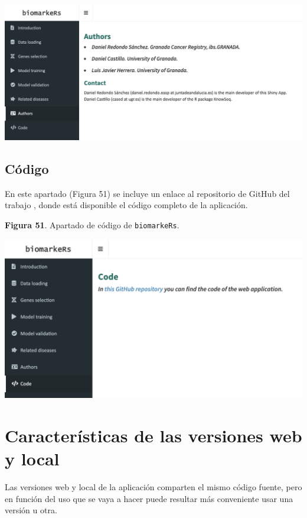 \begin{center}
	\includegraphics[width=.90\textwidth]{figuras/50_authors.png} \\
\end{center}

\subsection{Código}

En este apartado (Figura 51) se incluye un enlace al repositorio de GitHub del trabajo \cite{Redondo-Sanchez2020}, donde está disponible el código completo de la aplicación.

\begin{center}
	\textbf{Figura 51}. Apartado de código  de \texttt{biomarkeRs}.
\end{center}

\begin{center}
	\includegraphics[width=.80\textwidth]{figuras/51_code.png} \\
\end{center}

\section{Características de las versiones web y local}

Las versiones web y local de la aplicación comparten el mismo código fuente, pero en función del uso que se vaya a hacer puede resultar más conveniente usar una versión u otra.\\

